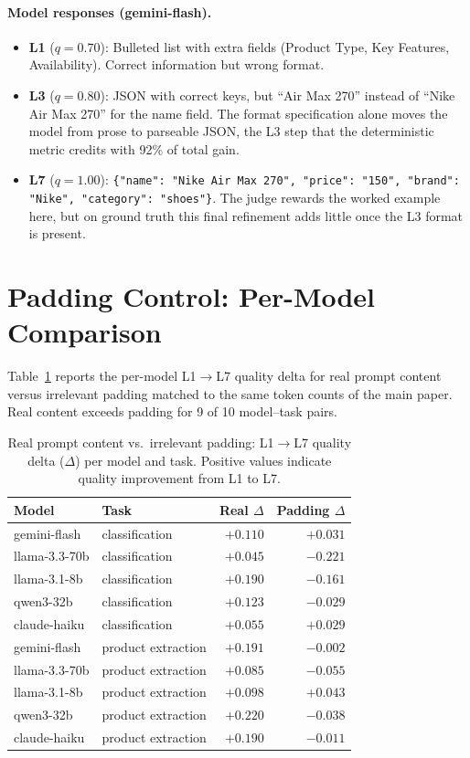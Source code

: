 \paragraph{Model responses (gemini-flash).}
\begin{itemize}
  \item \textbf{L1} ($q=0.70$): Bulleted list with extra fields (Product Type,
    Key Features, Availability). Correct information but wrong format.
  \item \textbf{L3} ($q=0.80$): JSON with correct keys, but ``Air Max 270''
    instead of ``Nike Air Max 270'' for the name field. The format
    specification alone moves the model from prose to parseable JSON, the L3
    step that the deterministic metric credits with 92\% of total gain.
  \item \textbf{L7} ($q=1.00$):
    \texttt{\{"name": "Nike Air Max 270", "price": "150", "brand": "Nike",
    "category": "shoes"\}}. The judge rewards the worked example here, but on
    ground truth this final refinement adds little once the L3 format is
    present.
\end{itemize}


\section{Padding Control: Per-Model Comparison}
\label{app:padding-permodel}

Table~\ref{tab:padding} reports the per-model L1$\to$L7 quality delta for real
prompt content versus irrelevant padding matched to the same token counts
of the main paper. Real content exceeds
padding for 9 of 10 model--task pairs.

\begin{table}[h]
\centering
\caption{Real prompt content vs.\ irrelevant padding: L1$\to$L7 quality
  delta ($\Delta$) per model and task.
  Positive values indicate quality improvement from L1 to L7.}
\label{tab:padding}
\small
\begin{tabular}{llrr}
\toprule
Model & Task & Real $\Delta$ & Padding $\Delta$ \\
\midrule
gemini-flash  & classification & $+0.110$ & $+0.031$ \\
llama-3.3-70b & classification & $+0.045$ & $-0.221$ \\
llama-3.1-8b  & classification & $+0.190$ & $-0.161$ \\
qwen3-32b     & classification & $+0.123$ & $-0.029$ \\
claude-haiku  & classification & $+0.055$ & $+0.029$ \\
\midrule
gemini-flash  & product extraction & $+0.191$ & $-0.002$ \\
llama-3.3-70b & product extraction & $+0.085$ & $-0.055$ \\
llama-3.1-8b  & product extraction & $+0.098$ & $+0.043$ \\
qwen3-32b     & product extraction & $+0.220$ & $-0.038$ \\
claude-haiku  & product extraction & $+0.190$ & $-0.011$ \\
\bottomrule
\end{tabular}
\end{table}

